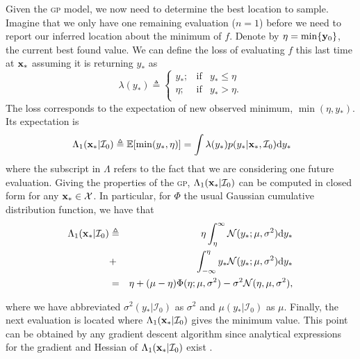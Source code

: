 \documentclass[twoside]{article}
\newcommand{\I}{\mathcal{I}}
\newcommand{\ud}{\mathrm{d}}
\newcommand{\E}{\mathbb{E}}
\newcommand{\acr}[1]{\textsc{#1}\xspace}
\newcommand{\gp}{\acr{gp}}
\begin{document}
Given the \gp model, we now need to determine the best location to sample. Imagine that we only have one remaining evaluation ($n=1$) before we need to report our inferred location about the minimum of $f$. Denote by $\eta = \min \{\mathbf{y}_0\}$, the current best found value. We can define the loss of evaluating $f$ this last time at $\mathbf{x}_*$ assuming it is returning $y_*$ as
$$\lambda(y_*)\triangleq \left\{ \begin{array}{lcl}
y_*;             & \mbox{if}  &  y_* \leq \eta \\
 \eta; & \mbox{if}  & y_* > \eta. \\
\end{array}
\right.$$
The loss corresponds to the expectation of new observed minimum, $\min (\eta,y_*)$. Its expectation is 
$$\ \Lambda_1(\latentVector_*| \I_0) \triangleq \E[ \min (y_*,\eta)]= \int \lambda(y_*)p(y_* |\latentVector_*,\I_0)\ud y_*$$
where the subscript in $\Lambda$ refers to the fact that we are considering one future evaluation.  Giving the properties of the \gp, $\Lambda_1(\latentVector_*| \I_0)$ can be computed in closed form for any $\mathbf{x}_* \in \mathcal{X}$. In particular, for $\Phi$ the usual Gaussian cumulative distribution function, we have that
\begin{eqnarray}\label{eq:expected_myopic_loss}
\Lambda_1(\latentVector_*| \I_0) &  \triangleq & \eta \int_{\eta}^{\infty} \mathcal{N}(y_*;\mu,\sigma^2) \ud y_* \\ \nonumber
& +  & \int_{-\infty}^{\eta} y_* \mathcal{N}(y_*;\mu,\sigma^2) \ud y_*  \\ \nonumber
& = &  \eta +(\mu  - \eta) \Phi (\eta ; \mu, \sigma^2) - \sigma^2 \mathcal{N} (\eta, \mu, \sigma^2), \nonumber
\end{eqnarray}

where we have abbreviated $\sigma^2(y_*|\I_0)$ as $\sigma^2$ and $\mu(y_{*}|\I_0)$ as $\mu$. Finally, the next evaluation is located   where $\Lambda_1(\latentVector_*| \I_0) $ gives the minimum value. This point can  be obtained by any gradient descent algorithm since analytical expressions for the gradient and Hessian of $\Lambda_1(\latentVector_*| \I_0)$  exist \citep{osborne_bayesian_2010}. 




\end{document}
